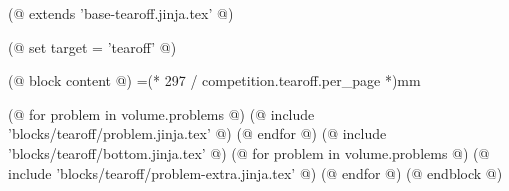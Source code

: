 (@ extends 'base-tearoff.jinja.tex' @)

(@ set target = 'tearoff' @)

(@ block content @)
    \eject
    \pdfpagewidth=210mm
    \pdfpageheight=(* 297 / competition.tearoff.per_page *)mm
    \pagestyle{tearoff}

    (@ for problem in volume.problems @)
        (@ include 'blocks/tearoff/problem.jinja.tex' @)
        \newpage
    (@ endfor @)
    (@ include 'blocks/tearoff/bottom.jinja.tex' @)
    (@ for problem in volume.problems @)
        (@ include 'blocks/tearoff/problem-extra.jinja.tex' @)
    (@ endfor @)
(@ endblock @)

